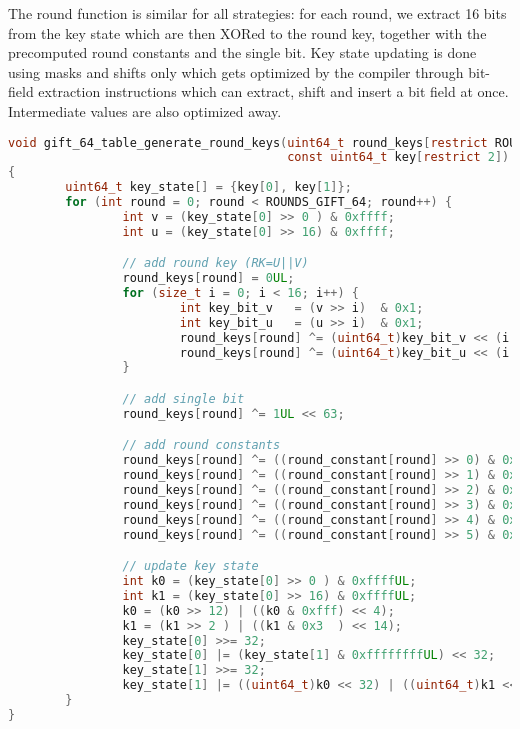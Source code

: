 The round function is similar for all strategies: for each round, we extract 16
bits from the key state which are then XORed to the round key, together with
the precomputed round constants and the single bit. Key state updating is done
using masks and shifts only which gets optimized by the compiler through
bit-field extraction instructions which can extract, shift and insert a bit
field at once. Intermediate values are also optimized away.

\begin{lstlisting}[caption={Round key generation function}, language=c]
void gift_64_table_generate_round_keys(uint64_t round_keys[restrict ROUNDS_GIFT_64],
                                       const uint64_t key[restrict 2])
{
        uint64_t key_state[] = {key[0], key[1]};
        for (int round = 0; round < ROUNDS_GIFT_64; round++) {
                int v = (key_state[0] >> 0 ) & 0xffff;
                int u = (key_state[0] >> 16) & 0xffff;

                // add round key (RK=U||V)
                round_keys[round] = 0UL;
                for (size_t i = 0; i < 16; i++) {
                        int key_bit_v   = (v >> i)  & 0x1;
                        int key_bit_u   = (u >> i)  & 0x1;
                        round_keys[round] ^= (uint64_t)key_bit_v << (i * 4 + 0);
                        round_keys[round] ^= (uint64_t)key_bit_u << (i * 4 + 1);
                }

                // add single bit
                round_keys[round] ^= 1UL << 63;

                // add round constants
                round_keys[round] ^= ((round_constant[round] >> 0) & 0x1) << 3;
                round_keys[round] ^= ((round_constant[round] >> 1) & 0x1) << 7;
                round_keys[round] ^= ((round_constant[round] >> 2) & 0x1) << 11;
                round_keys[round] ^= ((round_constant[round] >> 3) & 0x1) << 15;
                round_keys[round] ^= ((round_constant[round] >> 4) & 0x1) << 19;
                round_keys[round] ^= ((round_constant[round] >> 5) & 0x1) << 23;

                // update key state
                int k0 = (key_state[0] >> 0 ) & 0xffffUL;
                int k1 = (key_state[0] >> 16) & 0xffffUL;
                k0 = (k0 >> 12) | ((k0 & 0xfff) << 4);
                k1 = (k1 >> 2 ) | ((k1 & 0x3  ) << 14);
                key_state[0] >>= 32;
                key_state[0] |= (key_state[1] & 0xffffffffUL) << 32;
                key_state[1] >>= 32;
                key_state[1] |= ((uint64_t)k0 << 32) | ((uint64_t)k1 << 48);
        }
}
\end{lstlisting}

